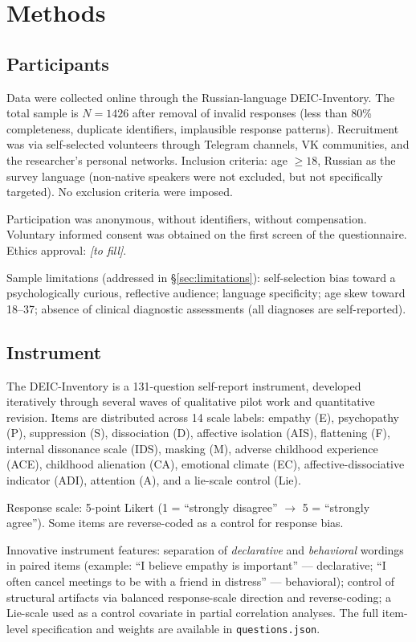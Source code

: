 \section{Methods}
\label{sec:methods}

\subsection{Participants}

Data were collected online through the Russian-language DEIC-Inventory. The total sample is $N = 1426$ after removal of invalid responses (less than 80\% completeness, duplicate identifiers, implausible response patterns). Recruitment was via self-selected volunteers through Telegram channels, VK communities, and the researcher's personal networks. Inclusion criteria: age $\geq 18$, Russian as the survey language (non-native speakers were not excluded, but not specifically targeted). No exclusion criteria were imposed.

Participation was anonymous, without identifiers, without compensation. Voluntary informed consent was obtained on the first screen of the questionnaire. Ethics approval: \textit{[to fill]}.

Sample limitations (addressed in §\ref{sec:limitations}): self-selection bias toward a psychologically curious, reflective audience; language specificity; age skew toward 18--37; absence of clinical diagnostic assessments (all diagnoses are self-reported).

\subsection{Instrument}

The DEIC-Inventory is a 131-question self-report instrument, developed iteratively through several waves of qualitative pilot work and quantitative revision. Items are distributed across 14 scale labels: empathy (E), psychopathy (P), suppression (S), dissociation (D), affective isolation (AIS), flattening (F), internal dissonance scale (IDS), masking (M), adverse childhood experience (ACE), childhood alienation (CA), emotional climate (EC), affective-dissociative indicator (ADI), attention (A), and a lie-scale control (Lie).

Response scale: 5-point Likert (1 = ``strongly disagree'' $\to$ 5 = ``strongly agree''). Some items are reverse-coded as a control for response bias.

Innovative instrument features: separation of \emph{declarative} and \emph{behavioral} wordings in paired items (example: ``I believe empathy is important'' --- declarative; ``I often cancel meetings to be with a friend in distress'' --- behavioral); control of structural artifacts via balanced response-scale direction and reverse-coding; a Lie-scale used as a control covariate in partial correlation analyses. The full item-level specification and weights are available in \texttt{questions.json}.

